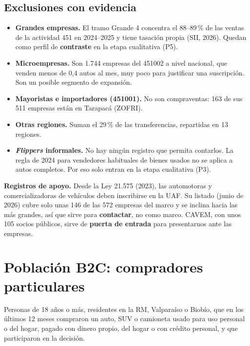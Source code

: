 \documentclass[11pt,a4paper]{article}
\begin{document}
\subsection{Exclusiones con evidencia}
\begin{itemize}
\item \textbf{Grandes empresas.} El tramo Grande 4 concentra el 88–89\,\% de las ventas de la actividad 451 en 2024–2025 y tiene tasación propia (SII, 2026). Quedan como perfil de \textbf{contraste} en la etapa cualitativa (P5).
\item \textbf{Microempresas.} Son 1.744 empresas del 451002 a nivel nacional, que venden menos de 0,4 autos al mes, muy poco para justificar una suscripción. Son un posible segmento de expansión.
\item \textbf{Mayoristas e importadores (451001).} No son compraventas: 163 de sus 511 empresas están en Tarapacá (ZOFRI).
\item \textbf{Otras regiones.} Suman el 29\,\% de las transferencias, repartidas en 13 regiones.
\item \textbf{\emph{Flippers} informales.} No hay ningún registro que permita contarlos. La regla de 2024 para vendedores habituales de bienes usados no se aplica a autos completos. Por eso solo entran en la etapa cualitativa (P3).
\end{itemize}

\textbf{Registros de apoyo.} Desde la Ley 21.575 (2023), las automotoras y comercializadoras de vehículos deben inscribirse en la UAF. Su listado (junio de 2026) cubre solo unas 146 de las 572 empresas del marco y se inclina hacia las más grandes, así que sirve para \textbf{contactar}, no como marco. CAVEM, con unos 105 socios públicos, sirve de \textbf{puerta de entrada} para presentarnos ante las empresas.

\section{Población B2C: compradores particulares}\label{sec:b2c}

\begin{keybox}[title=Definición]
Personas de 18 años o más, residentes en la RM, Valparaíso o Biobío, que en los últimos 12 meses compraron un auto, SUV o camioneta usado para uso personal o del hogar, pagado con dinero propio, del hogar o con crédito personal, y que participaron en la decisión.
\end{keybox}
\end{document}

